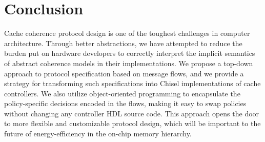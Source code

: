 \section{Conclusion}

Cache coherence protocol design is one of the toughest challenges in computer architecture.
Through better abstractions, we have attempted to reduce the burden put on hardware developers
to correctly interpret the implicit semantics of abstract coherence models in their implementations.
We propose a top-down approach to protocol specification based on message flows, and we provide a strategy
for transforming such specifications into Chisel implementations of cache controllers.
We also utilize object-oriented programming to encapsulate the policy-specific decisions encoded
in the flows, making it easy to swap policies without changing any controller HDL source code.
This approach opens the door to more flexible and customizable protocol design, which will be important
to the future of energy-efficiency in the on-chip memory hierarchy.
